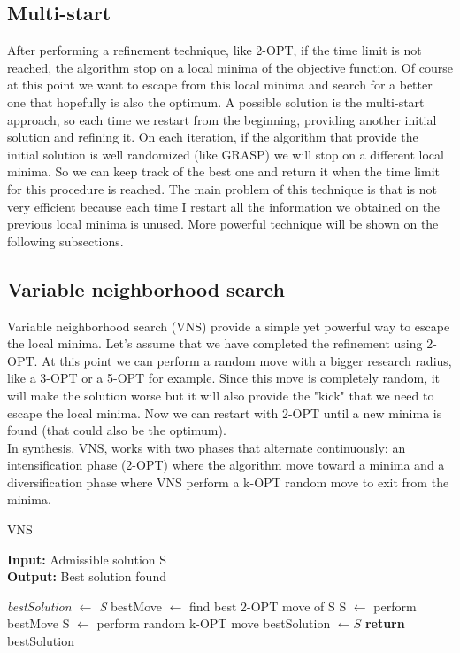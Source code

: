 \subsection{Multi-start}
After performing a refinement technique, like 2-OPT, if the time limit is not reached, the algorithm stop on a local minima of the objective function. Of course at this point we want to escape from this local minima and search for a better one that hopefully is also the optimum. A possible solution is the multi-start approach, so each time we restart from the beginning, providing another initial solution and refining it. On each iteration, if the algorithm that provide the initial solution is well randomized (like GRASP) we will stop on a different local minima. So we can keep track of the best one and return it when the time limit for this procedure is reached.
The main problem of this technique is that is not very efficient because each time I restart all the information we obtained on the previous local minima is unused.
More powerful technique will be shown on the following subsections.

\subsection{Variable neighborhood search}
Variable neighborhood search (VNS) provide a simple yet powerful way to escape the local minima. Let's assume that we have completed the refinement using 2-OPT. At this point we can perform a random move with a bigger research radius, like a 3-OPT or a 5-OPT for example. Since this move is completely random, it will make the solution worse but it will also provide the "kick" that we need to escape the local minima. Now we can restart with 2-OPT until a new minima is found (that could also be the optimum).\\
In synthesis, VNS, works with two phases that alternate continuously: an intensification  phase (2-OPT) where the algorithm move toward a minima and a diversification phase where VNS perform a k-OPT random move to exit from the minima.

\begin{algorithm}
	\caption{VNS}\label{VNS method}
	\hspace*{\algorithmicindent} \textbf{Input:} Admissible solution S \\
	\hspace*{\algorithmicindent} \textbf{Output:} Best solution found
    \begin{algorithmic}[1]
    		\State \textit{bestSolution $\leftarrow$ S}
			\State bestMove $\leftarrow$ find best 2-OPT move of S
				\State S $\leftarrow$ perform bestMove
			\Else
				\State S $\leftarrow$ perform random k-OPT move
			\EndIf
				\State bestSolution $\leftarrow S$
			\EndIf
		\EndWhile
		\State \textbf{return} bestSolution
    \end{algorithmic}
\end{algorithm}

